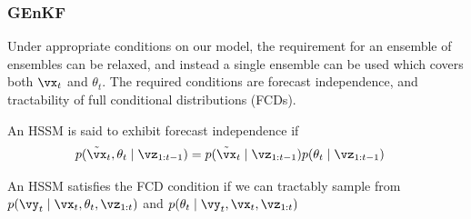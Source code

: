 \documentclass[12pt]{article}
\begin{document}
\subsubsection{GEnKF}
Under appropriate conditions on our model, the requirement for an ensemble of
ensembles can be relaxed, and instead a single ensemble can be used which
covers both $\vx_t$ and $\theta_t$. The required conditions are forecast
independence, and tractability of full conditional distributions (FCDs).

\begin{condition}\label{cond:forecast}
An HSSM is said to exhibit forecast independence if
\begin{align}
    p(\tilde\vx_t, \theta_t \mid \vz_{1:t-1}) &=
        p(\tilde\vx_t \mid \vz_{1:t-1})p(\theta_t \mid \vz_{1:t-1})
\end{align}
\end{condition}

\begin{condition}\label{cond:conditional}
An HSSM satisfies the FCD condition if we can
tractably sample from $p(\vy_t \mid \vx_t,\theta_t,\vz_{1:t})$ and 
$p(\theta_t \mid \vy_t, \vx_t, \vz_{1:t})$
\end{condition}
\end{document}
